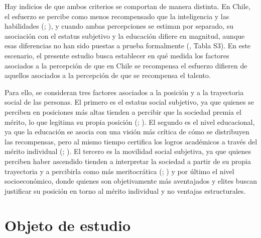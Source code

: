 \documentclass[
  spanish,
  a4paper,
  oneside]{scrbook}
\begin{document}
Hay indicios de que ambos criterios se comportan de manera distinta. En
Chile, el esfuerzo se percibe como menos recompensado que la
inteligencia y las habilidades
(; ), y cuando ambas percepciones se estiman por separado, su
asociación con el estatus subjetivo y la educación difiere en magnitud,
aunque esas diferencias no han sido puestas a prueba formalmente
(, Tabla S3). En este escenario, el presente estudio busca
establecer en qué medida los factores asociados a la percepción de que
en Chile se recompensa el esfuerzo difieren de aquellos asociados a la
percepción de que se recompensa el talento.

Para ello, se consideran tres factores asociados a la posición y a la
trayectoria social de las personas. El primero es el estatus social
subjetivo, ya que quienes se perciben en posiciones más altas tienden a
percibir que la sociedad premia el mérito, lo que legitima su propia
posición (; ). El segundo es el nivel educacional, ya que la educación
se asocia con una visión más crítica de cómo se distribuyen las
recompensas, pero al mismo tiempo certifica los logros académicos a
través del mérito individual
(;
). El tercero es la movilidad social subjetiva, ya que quienes
perciben haber ascendido tienden a interpretar la sociedad a partir de
su propia trayectoria y a percibirla como más meritocrática
(;
) y por último el nivel socioeconómico, donde quienes son
objetivamente más aventajados y elites buscan justificar su posición en
torno al mérito individual y no ventajas estructurales.

\section{Objeto de estudio}\label{objeto-de-estudio}
\end{document}
